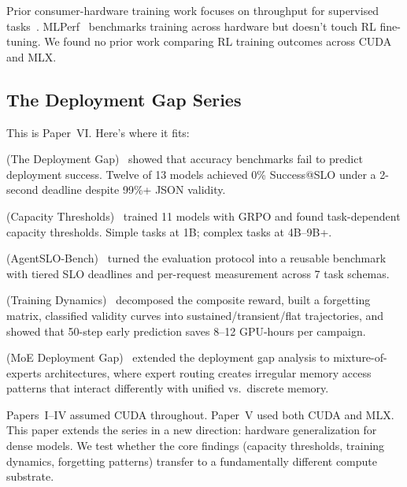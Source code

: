 \documentclass[11pt]{article}
\begin{document}
Prior consumer-hardware training work focuses on throughput for supervised tasks~\citep{zhu2023survey}.  MLPerf~\citep{mattson2020mlperf} benchmarks training across hardware but doesn't touch RL fine-tuning.  We found no prior work comparing RL training outcomes across CUDA and MLX.

\subsection{The Deployment Gap Series}

This is Paper~VI.  Here's where it fits:

\begin{description}[leftmargin=*]
\item[Paper~I] (The Deployment Gap)~\citep{maloney2025deploymentgap} showed that accuracy benchmarks fail to predict deployment success.  Twelve of 13 models achieved 0\% Success@SLO under a 2-second deadline despite 99\%+ JSON validity.

\item[Paper~II] (Capacity Thresholds)~\citep{maloney2025capacity} trained 11 models with GRPO and found task-dependent capacity thresholds.  Simple tasks at 1B; complex tasks at 4B--9B+.

\item[Paper~III] (AgentSLO-Bench)~\citep{maloney2025agentslobench} turned the evaluation protocol into a reusable benchmark with tiered SLO deadlines and per-request measurement across 7 task schemas.

\item[Paper~IV] (Training Dynamics)~\citep{maloney2025dynamics} decomposed the composite reward, built a forgetting matrix, classified validity curves into sustained/transient/flat trajectories, and showed that 50-step early prediction saves 8--12 GPU-hours per campaign.

\item[Paper~V] (MoE Deployment Gap)~\citep{maloney2025moe} extended the deployment gap analysis to mixture-of-experts architectures, where expert routing creates irregular memory access patterns that interact differently with unified vs.\ discrete memory.
\end{description}

Papers~I--IV assumed CUDA throughout.  Paper~V used both CUDA and MLX.  This paper extends the series in a new direction: hardware generalization for dense models.  We test whether the core findings (capacity thresholds, training dynamics, forgetting patterns) transfer to a fundamentally different compute substrate.
\end{document}
